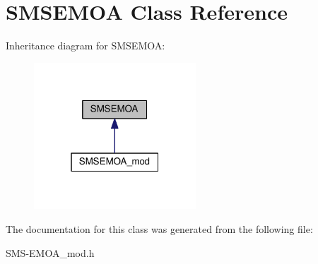 \hypertarget{classSMSEMOA}{}\section{S\+M\+S\+E\+M\+OA Class Reference}
\label{classSMSEMOA}


Inheritance diagram for S\+M\+S\+E\+M\+OA\+:\nopagebreak
\begin{figure}[H]
\begin{center}
\leavevmode
\includegraphics[width=172pt]{classSMSEMOA__inherit__graph}
\end{center}
\end{figure}


The documentation for this class was generated from the following file\+:\begin{DoxyCompactItemize}
\item 
S\+M\+S-\/\+E\+M\+O\+A\+\_\+mod.\+h\end{DoxyCompactItemize}
